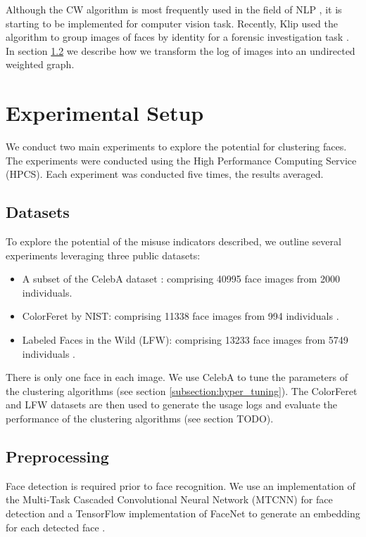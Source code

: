 \documentclass[a4paper,12pt]{report}
\begin{document}
Although the CW algorithm is most frequently used in the field of NLP \cite{di2013clustering}, it is starting to be implemented for computer vision task. Recently, Klip used the algorithm to group images of faces by identity for a forensic investigation task \cite{klip2019fuzzy}. In section \ref{subsection:preprocessing} we describe how we transform the log of images into an undirected weighted graph.

\section{Experimental Setup}
We conduct two main experiments to explore the potential for clustering faces. The experiments were conducted using the High Performance Computing Service (HPCS). Each experiment was conducted five times, the results averaged.

\subsection{Datasets}
\label{subsection:datasets}
To explore the potential of the misuse indicators described, we outline several experiments leveraging three public datasets:
\begin{itemize}
    \item A subset of the CelebA dataset \cite{liu2015faceattributes}: comprising 40995 face images from 2000 individuals.
    \item ColorFeret by NIST: comprising 11338 face images from 994 individuals \cite{phillips1998feret}.
    \item Labeled Faces in the Wild (LFW): comprising 13233 face images from 5749 individuals \cite{LFWTech}. 
\end{itemize}

There is only one face in each image. We use CelebA to tune the parameters of the clustering algorithms (see section \ref{subsection:hyper_tuning}). The ColorFeret and LFW datasets are then used to generate the usage logs and evaluate the performance of the clustering algorithms (see section TODO). 

\subsection{Preprocessing}
\label{subsection:preprocessing}
Face detection is required prior to face recognition. We use an implementation of the Multi-Task Cascaded Convolutional Neural Network (MTCNN) for face detection and a TensorFlow implementation of FaceNet to generate an embedding for each detected face \cite{davidsan69:online}. 
\end{document}
